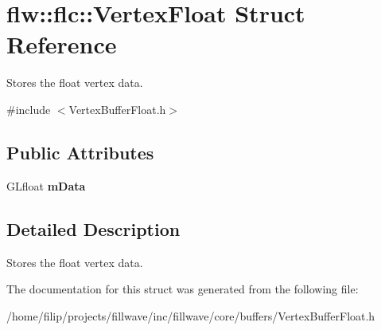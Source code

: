 \hypertarget{structflw_1_1flc_1_1VertexFloat}{}\section{flw\+:\+:flc\+:\+:Vertex\+Float Struct Reference}
\label{structflw_1_1flc_1_1VertexFloat}


Stores the float vertex data.  




{\ttfamily \#include $<$Vertex\+Buffer\+Float.\+h$>$}

\subsection*{Public Attributes}
\begin{DoxyCompactItemize}
\item 
\mbox{\label{structflw_1_1flc_1_1VertexFloat_a253155de7cc292ccd297f941c2d8c68b}} 
G\+Lfloat {\bfseries m\+Data}
\end{DoxyCompactItemize}


\subsection{Detailed Description}
Stores the float vertex data. 

The documentation for this struct was generated from the following file\+:\begin{DoxyCompactItemize}
\item 
/home/filip/projects/fillwave/inc/fillwave/core/buffers/Vertex\+Buffer\+Float.\+h\end{DoxyCompactItemize}
